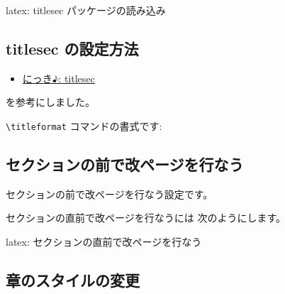 \documentclass[dvipdfmx,a4j,14pt,uplatex,openany]{jsbook}
\begin{document}
\begin{programlist}[label={org533fbd6}]{latex}{: titlesec パッケージの読み込み}\usepackage{titlesec}
\end{programlist}
\subsection{titlesec の設定方法}
\label{sec:org4d0f79f}
\begin{itemize}
\item \href{http://abenori.blogspot.com/2018/05/titlesec.html}{にっき♪: titlesec}
\end{itemize}

を参考にしました。

\texttt{\textbackslash{}titleformat} コマンドの書式です:


\subsection{セクションの前で改ページを行なう}
\label{sec:orgeb82236}
セクションの前で改ページを行なう設定です。

セクションの直前で改ページを行なうには
次のようにします。

\begin{programlist}[label={orga75d4e9}]{latex}{: セクションの直前で改ページを行なう}%
\newcommand{\sectionbreak}{\clearpage}
\end{programlist}


\subsection{章のスタイルの変更}
\label{sec:orgb1f2af1}
\end{document}
